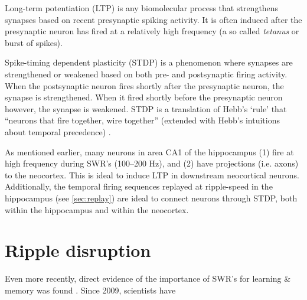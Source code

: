 Long-term potentiation (LTP) is any biomolecular process that strengthens  synapses based on recent presynaptic spiking activity. It is often induced after the presynaptic neuron has fired at a relatively high frequency (a so called \emph{tetanus} or burst of spikes).

Spike-timing dependent plasticity (STDP) is a phenomenon where synapses are strengthened or weakened based on both pre- and postsynaptic firing activity. When the postsynaptic neuron fires shortly after the presynaptic neuron, the synapse is strengthened. When it fired shortly before the presynaptic neuron however, the synapse is weakened. STDP is a translation of Hebb's `rule' that ``neurons that fire together, wire together'' (extended with Hebb's intuitions about temporal precedence) \cite{Caporale2008}.

As mentioned earlier, many neurons in area CA1 of the hippocampus (1) fire at high frequency during SWR's (100--200 Hz), and (2) have projections (i.e. axons) to the neocortex. This is ideal to induce LTP in downstream neocortical neurons. Additionally, the temporal firing sequences replayed at ripple-speed in the hippocampus (see \cref{sec:replay}) are ideal to connect neurons through STDP, both within the hippocampus and within the neocortex.





\section{Ripple disruption}

Even more recently, direct evidence of the importance of SWR's for learning \& memory was found \cite{Ego-Stengel2009,Girardeau2009,Jadhav2012,Girardeau2014,Talakoub2016}. Since 2009, scientists have 
